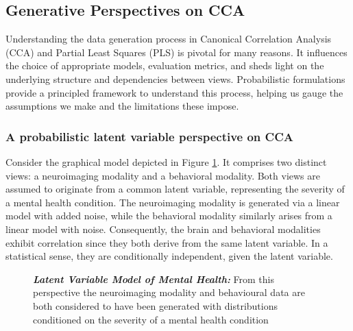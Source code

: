 \subsection{Generative Perspectives on CCA}\label{subsec:generative-perspectives-on-cca}
Understanding the data generation process in Canonical Correlation Analysis (CCA) and Partial Least Squares (PLS) is pivotal for many reasons.
It influences the choice of appropriate models, evaluation metrics, and sheds light on the underlying structure and dependencies between views.
Probabilistic formulations provide a principled framework to understand this process, helping us gauge the assumptions we make and the limitations these impose.

\subsubsection{A probabilistic latent variable perspective on CCA}\label{subsubsec:a-probabilistic-latent-variable-perspective-on-cca}

Consider the graphical model depicted in Figure \ref{fig:mentalhealthselfsupervised}.
It comprises two distinct views: a neuroimaging modality and a behavioral modality.
Both views are assumed to originate from a common latent variable, representing the severity of a mental health condition.
The neuroimaging modality is generated via a linear model with added noise, while the behavioral modality similarly arises from a linear model with noise.
Consequently, the brain and behavioral modalities exhibit correlation since they both derive from the same latent variable.
In a statistical sense, they are conditionally independent, given the latent variable.

\begin{figure}
    \centering
    \caption[Latent Variable Model of Mental Health]{\textit{\textbf{Latent Variable Model of Mental Health:}} From this perspective the neuroimaging modality and behavioural data are both considered to have been generated with distributions conditioned on the severity of a mental health condition}\label{fig:mentalhealthselfsupervised}
\end{figure}

